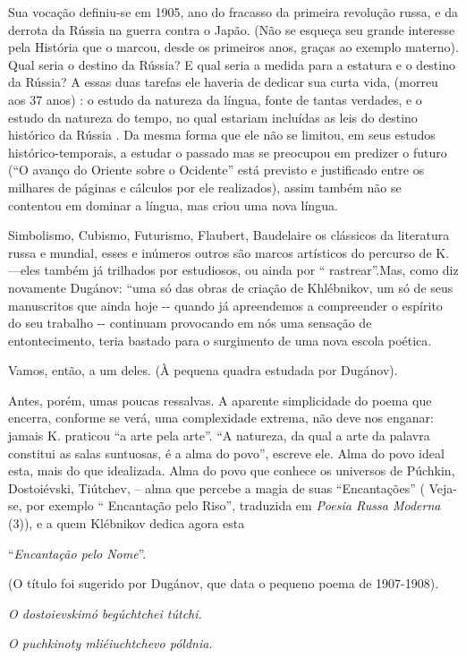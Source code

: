 Sua vocação definiu-se em 1905, ano do fracasso da primeira revolução
russa, e da derrota da Rússia na guerra contra o Japão. (Não se esqueça
seu grande interesse pela História que o marcou, desde os primeiros
anos, graças ao exemplo materno). Qual seria o destino da Rússia? E qual
seria a medida para a estatura e o destino da Rússia? A essas duas
tarefas ele haveria de dedicar sua curta vida, (morreu aos 37 anos) : o
estudo da natureza da língua, fonte de tantas verdades, e o estudo da
natureza do tempo, no qual estariam incluídas as leis do destino
histórico da Rússia . Da mesma forma que ele não se limitou, em seus
estudos histórico-temporais, a estudar o passado mas se preocupou em
predizer o futuro (``O avanço do Oriente sobre o Ocidente'' está
previsto e justificado entre os milhares de páginas e cálculos por ele
realizados), assim também não se contentou em dominar a língua, mas
criou uma nova língua.

Simbolismo, Cubismo, Futurismo, Flaubert, Baudelaire os clássicos da
literatura russa e mundial, esses e inúmeros outros são marcos
artísticos do percurso de K.---eles também já trilhados por estudiosos,
ou ainda por `` rastrear''.Mas, como diz novamente Dugánov: ``uma só das
obras de criação de Khlébnikov, um só de seus manuscritos que ainda hoje
-\/- quando já apreendemos a compreender o espírito do seu trabalho -\/-
continuam provocando em nós uma sensação de entontecimento, teria
bastado para o surgimento de uma nova escola poética.

Vamos, então, a um deles. (À pequena quadra estudada por Dugánov).

Antes, porém, umas poucas ressalvas. A aparente simplicidade do poema
que encerra, conforme se verá, uma complexidade extrema, não deve nos
enganar: jamais K. praticou ``a arte pela arte''. ``A natureza, da qual
a arte da palavra constitui as salas suntuosas, é a alma do povo'',
escreve ele. Alma do povo ideal esta, mais do que idealizada. Alma do
povo que conhece os universos de Púchkin, Dostoiévski, Tiútchev, -- alma
que percebe a magia de suas ``Encantações'' ( Veja-se, por exemplo ``
Encantação pelo Riso'', traduzida em \emph{Poesia Russa Moderna} (3)), e
a quem Klébnikov dedica agora esta

``\emph{Encantação pelo Nome}''.

(O título foi sugerido por Dugánov, que data o pequeno poema de
1907-1908).

\emph{O dostoievskimó begúchtchei tútchi.}

\emph{O puchkinoty mliéiuchtchevo póldnia.}

